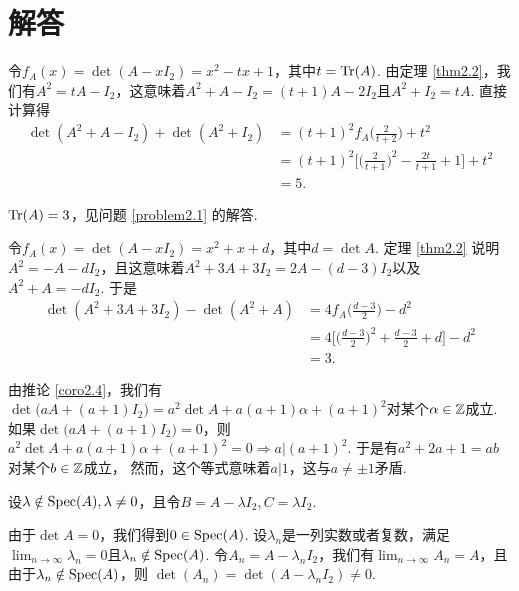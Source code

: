 \section{解答}
\begin{solution}
  令$f_A(x)=\det(A-xI_2)=x^2-tx+1$，其中$t=\operatorname{Tr}(A)$. 由定理 \ref{thm2.2}，我们有$A^2=tA-I_2$，这意味着$A^2+A-I_2=(t+1)A-2I_2$且$A^2+I_2=tA$. 直接计算得
  \begin{align*}
    \det(A^2 + A - I_2) + \det (A^2 + I_2) & =
    (t+1)^2f_A\Big(\frac2{t + 2}\Big) + t^2 \\
    & = (t+1)^2 \bigg[ \Big( \frac2{t+1} \Big)^2
    - \frac{2t}{t+1} + 1 \bigg] + t^2 \\
    & = 5.
  \end{align*}
\end{solution}

\begin{solution}
  $\operatorname{Tr}(A)=3$，见问题 \ref{problem2.1} 的解答.
\end{solution}

\begin{solution}
  令$f_A(x)=\det(A-xI_2)=x^2+x+d$，其中$d=\det A$. 定理 \ref{thm2.2} 说明$A^2=-A-dI_2$，且这意味着$A^2+3A+3I_2=2A-(d-3)I_2$以及$A^2+A=-dI_2$. 于是
  \begin{align*}
    \det (A^2 + 3A + 3I_2) - \det(A^2 + A) & =
    4f_A\Big( \frac{d-3}2 \Big) - d^2 \\
    & = 4\bigg[ \Big( \frac{d-3}2 \Big)^2 +
    \frac{d-3}2 + d \bigg] - d^2 \\
    & = 3.
  \end{align*}
\end{solution}

\begin{solution}
  由推论 \ref{coro2.4}，我们有$\det\big(aA+(a+1)I_2\big)=a^2\det A+a(a+1)\alpha+(a+1)^2$对某个$\alpha\in\mathbb Z$成立. 如果$\det\big(aA+(a+1)I_2\big)=0$，则$a^2\det A+a(a+1)\alpha+(a+1)^2=0\Rightarrow a|(a+1)^2$. 于是有$a^2+2a+1=ab$对某个$b\in\mathbb Z$成立， 然而，这个等式意味着$a|1$，这与$a\ne \pm1$矛盾.
\end{solution}

\begin{solution}
  设$\lambda\notin\operatorname{Spec}(A),\lambda\ne0$，且令$B=A-\lambda I_2,C=\lambda I_2$.
\end{solution}

\begin{solution}
  由于$\det A=0$，我们得到$0\in\operatorname{Spec}(A)$. 设$\lambda_n$是一列实数或者复数，满足$\lim_{n\to\infty}\lambda_n=0$且$\lambda_n\notin\operatorname{Spec}(A)$. 令$A_n=A-\lambda_nI_2$，我们有$\lim_{n\to\infty}A_n=A$，且由于$\lambda_n\notin\operatorname{Spec}(A)$，则 $\det(A_n)=\det(A-\lambda_nI_2)\ne0$.
\end{solution}

